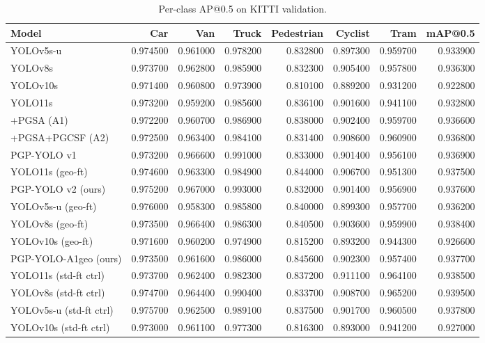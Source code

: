 \begin{table}
\caption{Per-class AP@0.5 on KITTI validation.}
\label{tab:perclass}
\begin{tabular}{lrrrrrrr}
\toprule
Model & Car & Van & Truck & Pedestrian & Cyclist & Tram & mAP@0.5 \\
\midrule
YOLOv5s-u & 0.974500 & 0.961000 & 0.978200 & 0.832800 & 0.897300 & 0.959700 & 0.933900 \\
YOLOv8s & 0.973700 & 0.962800 & 0.985900 & 0.832300 & 0.905400 & 0.957800 & 0.936300 \\
YOLOv10s & 0.971400 & 0.960800 & 0.973900 & 0.810100 & 0.889200 & 0.931200 & 0.922800 \\
YOLO11s & 0.973200 & 0.959200 & 0.985600 & 0.836100 & 0.901600 & 0.941100 & 0.932800 \\
+PGSA (A1) & 0.972200 & 0.960700 & 0.986900 & 0.838000 & 0.902400 & 0.959700 & 0.936600 \\
+PGSA+PGCSF (A2) & 0.972500 & 0.963400 & 0.984100 & 0.831400 & 0.908600 & 0.960900 & 0.936800 \\
PGP-YOLO v1 & 0.973200 & 0.966600 & 0.991000 & 0.833000 & 0.901400 & 0.956100 & 0.936900 \\
YOLO11s (geo-ft) & 0.974600 & 0.963300 & 0.984900 & 0.844000 & 0.906700 & 0.951300 & 0.937500 \\
PGP-YOLO v2 (ours) & 0.975200 & 0.967000 & 0.993000 & 0.832000 & 0.901400 & 0.956900 & 0.937600 \\
YOLOv5s-u (geo-ft) & 0.976000 & 0.958300 & 0.985800 & 0.840000 & 0.899300 & 0.957700 & 0.936200 \\
YOLOv8s (geo-ft) & 0.973500 & 0.966400 & 0.986300 & 0.840500 & 0.903600 & 0.959900 & 0.938400 \\
YOLOv10s (geo-ft) & 0.971600 & 0.960200 & 0.974900 & 0.815200 & 0.893200 & 0.944300 & 0.926600 \\
PGP-YOLO-A1geo (ours) & 0.973500 & 0.961600 & 0.986000 & 0.845600 & 0.902300 & 0.957400 & 0.937700 \\
YOLO11s (std-ft ctrl) & 0.973700 & 0.962400 & 0.982300 & 0.837200 & 0.911100 & 0.964100 & 0.938500 \\
YOLOv8s (std-ft ctrl) & 0.974700 & 0.964400 & 0.990400 & 0.833700 & 0.908700 & 0.965200 & 0.939500 \\
YOLOv5s-u (std-ft ctrl) & 0.975700 & 0.962500 & 0.989100 & 0.837500 & 0.901700 & 0.960500 & 0.937800 \\
YOLOv10s (std-ft ctrl) & 0.973000 & 0.961100 & 0.977300 & 0.816300 & 0.893000 & 0.941200 & 0.927000 \\

\end{tabular}
\end{table}

